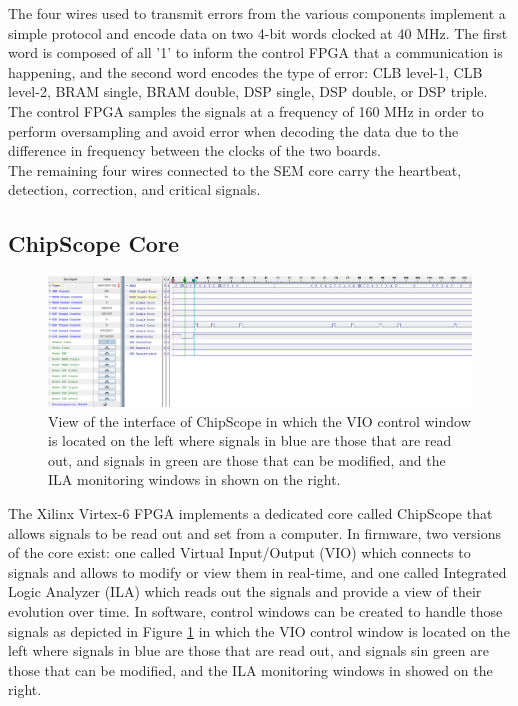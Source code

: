       The four wires used to transmit errors from the various components implement a simple protocol and encode data on two 4-bit words clocked at 40 MHz. The first word is composed of all '1' to inform the control FPGA that a communication is happening, and the second word encodes the type of error: CLB level-1, CLB level-2, BRAM single, BRAM double, DSP single, DSP double, or DSP triple. The control FPGA samples the signals at a frequency of 160 MHz in order to perform oversampling and avoid error when decoding the data due to the difference in frequency between the clocks of the two boards. \\

      The remaining four wires connected to the SEM core carry the heartbeat, detection, correction, and critical signals.

    \subsection{ChipScope Core}

      \begin{figure}
        \centering
        \includegraphics[width=\textwidth]{img/II-5-irradiation/cs-clb.png}
        \caption{View of the interface of ChipScope in which the VIO control window is located on the left where signals in blue are those that are read out, and signals in green are those that can be modified, and the ILA monitoring windows in shown on the right.}
        \label{fig:II-5-cs-clb}
      \end{figure}

      The Xilinx Virtex-6 FPGA implements a dedicated core called ChipScope that allows signals to be read out and set from a computer. In firmware, two versions of the core exist: one called Virtual Input/Output (VIO) which connects to signals and allows to modify or view them in real-time, and one called Integrated Logic Analyzer (ILA) which reads out the signals and provide a view of their evolution over time. In software, control windows can be created to handle those signals as depicted in Figure \ref{fig:II-5-cs-clb} in which the VIO control window is located on the left where signals in blue are those that are read out, and signals sin green are those that can be modified, and the ILA monitoring windows in showed on the right. \\

